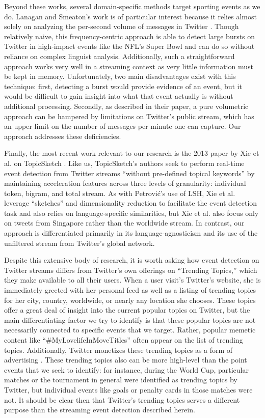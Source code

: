 \documentclass{sig-alternate}
\begin{document}
Beyond these works, several domain-specific methods target sporting events as we do\cite{vasudevan2013twitter,Zhao2011,lanagan2011using}.
Lanagan and Smeaton's work is of particular interest because it relies almost solely on analyzing the per-second volume of messages in Twitter \cite{lanagan2011using}.
Though relatively naive, this frequency-centric approach is able to detect large bursts on Twitter in high-impact events like the NFL's Super Bowl and can do so without reliance on complex linguist analysis.
Additionally, such a straightforward approach works very well in a streaming context as very little information must be kept in memory.
Unfortunately, two main disadvantages exist with this technique: first, detecting a burst would provide evidence of an event, but it would be difficult to gain insight into what that event actually is without additional processing.
Secondly, as described in their paper, a pure volumetric approach can be hampered by limitations on Twitter's public stream, which has an upper limit on the number of messages per minute one can capture.
Our approach addresses these deficiencies.

Finally, the most recent work relevant to our research is the 2013 paper by Xie et al. on TopicSketch \cite{xie2013topicsketch}.
Like us, TopicSketch's authors seek to perform real-time event detection from Twitter streams ``without pre-defined topical keywords'' by maintaining acceleration features across three levels of granularity: individual token, bigram, and total stream.
As with Petrovi\'{c}'s use of LSH, Xie et al. leverage ``sketches'' and dimensionality reduction to facilitate the event detection task and also relies on language-specific similarities, but Xie et al. also focus only on tweets from Singapore rather than the worldwide stream.
In contrast, our approach is differentiated primarily in its language-agnosticism and its use of the unfiltered stream from Twitter's global network.

Despite this extensive body of research, it is worth asking how event detection on Twitter streams differs from Twitter's own offerings on ``Trending Topics,'' which they make available to all their users.
When a user visit's Twitter's website, she is immediately greeted with her personal feed as well as a listing of trending topics for her city, country, worldwide, or nearly any location she chooses.
These topics offer a great deal of insight into the current popular topics on Twitter, but the main differentiating factor we try to identify is that these popular topics are not necessarily connected to specific events that we target.
Rather, popular memetic content like ``\#MyLovelifeInMoveTitles'' often appear on the list of trending topics.
Additionally, Twitter monetizes these trending topics as a form of advertising \cite{Sydell2011}.  
These trending topics also can be more high-level than the point events that we seek to identify: for instance, during the World Cup, particular matches or the tournament in general were identified as trending topics by Twitter, but individual events like goals or penalty cards in those matches were not.
It should be clear then that Twitter's trending topics serves a different purpose than the streaming event detection described herein.
\end{document}
